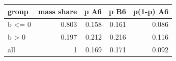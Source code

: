 \begin{tabular}{lrrrr}
\toprule
group & mass share & p A6 & p B6 & p(1-p) A6 \\
\midrule
b <= 0 & 0.803 & 0.158 & 0.161 & 0.086 \\
b > 0 & 0.197 & 0.212 & 0.216 & 0.116 \\
all & 1 & 0.169 & 0.171 & 0.092 \\
\bottomrule
\end{tabular}
